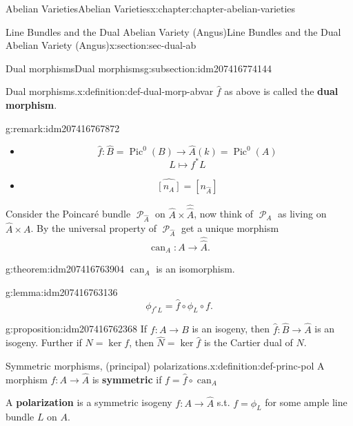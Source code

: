 \documentclass[oneside,10pt,]{book}
\newcommand{\terminology}[1]{\textbf{#1}}
\numberwithin{equation}{section}
\newcommand{\sheaf}[1]{\operatorname{\mathcal{#1}}}
\newcommand{\lb}{[}
\newcommand{\rb}{]}
\DeclareMathOperator{\Pic}{Pic}
\begin{document}
\begin{chapterptx}{Abelian Varieties}{}{Abelian Varieties}{}{}{x:chapter:chapter-abelian-varieties}
\begin{sectionptx}{Line Bundles and the Dual Abelian Variety (Angus)}{}{Line Bundles and the Dual Abelian Variety (Angus)}{}{}{x:section:sec-dual-ab}
\begin{subsectionptx}{Dual morphisms}{}{Dual morphisms}{}{}{g:subsection:idm207416774144}
%
\begin{definition}{Dual morphisms.}{x:definition:def-dual-morp-abvar}%
\(\hat f\) as above is called the \terminology{dual morphism}.%
\end{definition}
\begin{remark}{}{g:remark:idm207416767872}%
%
\begin{itemize}[label=\textbullet]
\item{}%
\begin{equation*}
\hat f\colon \hat B = \Pic^0(B) \to \hat A(k) = \Pic^0(A)
\end{equation*}
%
\begin{equation*}
L\mapsto f^*L
\end{equation*}
%
\item{}%
\begin{equation*}
\hat{\lb n_A\rb} = [n_{\hat A}]
\end{equation*}
%
\end{itemize}
%
\end{remark}
Consider the Poincaré bundle \(\sheaf P_{\hat A}\) on \(\hat A \times \hat{\hat{A}}\), now think of \(\sheaf P_A\) as living on \(\hat A \times A\). By the universal property of \(\sheaf P_{\hat A}\) get a unique morphism%
\begin{equation*}
\operatorname{can}_A\colon A\to\hat{\hat A}\text{.}
\end{equation*}
%
\begin{theorem}{}{}{g:theorem:idm207416763904}%
\(\operatorname{can}_A\) is an isomorphism.%
\end{theorem}
\begin{lemma}{}{}{g:lemma:idm207416763136}%
%
\begin{equation*}
\phi_{f^*L} = \hat f\circ \phi_L\circ f\text{.}
\end{equation*}
%
\end{lemma}
\begin{proposition}{}{}{g:proposition:idm207416762368}%
If \(f\colon A \to B\) is an isogeny, then \(\hat f\colon \hat B \to \hat A\) is an isogeny. Further if \(N  = \ker f\), then \(\hat N = \ker \hat f\) is the Cartier  dual of \(N\).%
\end{proposition}
\begin{definition}{Symmetric morphisms, (principal) polarizations.}{x:definition:def-princ-pol}%
A morphism \(f\colon A \to \hat A\) is \terminology{symmetric} if \(f = \hat f\circ \operatorname{can}_A\)%
\par
A \terminology{polarization} is a symmetric isogeny \(f\colon A \to \hat A\) s.t. \(f=  \phi_L\) for some ample line bundle \(L\) on \(A\).%

\end{definition}
\end{subsectionptx}
\end{sectionptx}
\end{chapterptx}
\end{document}
